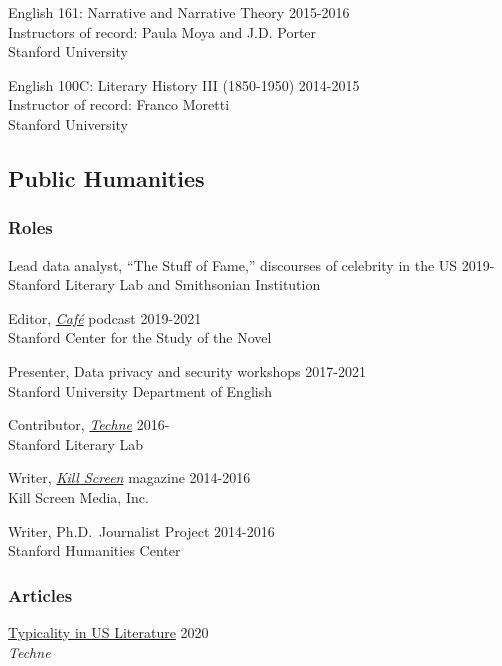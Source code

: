 \documentclass[
  12pt,
  letterpaper,
]{article}
\begin{document}
English 161: Narrative and Narrative Theory \hfill 2015-2016\\
Instructors of record: Paula Moya and J.D. Porter\\
Stanford University

English 100C: Literary History III (1850-1950) \hfill 2014-2015\\
Instructor of record: Franco Moretti\\
Stanford University

\hypertarget{public-humanities}{%
\subsection{Public Humanities}\label{public-humanities}}

\hypertarget{roles}{%
\subsubsection{Roles}\label{roles}}

Lead data analyst, ``The Stuff of Fame,'' discourses of celebrity in the
US \hfill 2019-\\
Stanford Literary Lab and Smithsonian Institution

Editor, \href{https://novel.stanford.edu/csn-cafe}{\emph{Café}} podcast
\hfill 2019-2021\\
Stanford Center for the Study of the Novel

Presenter, Data privacy and security workshops \hfill 2017-2021\\
Stanford University Department of English

Contributor, \href{https://litlab.stanford.edu/techne/}{\emph{Techne}}
\hfill 2016-\\
Stanford Literary Lab

Writer, \href{https://web.archive.org/web/20221003115514/https://killscreen.com/previously/author/erik-fredner/}{\emph{Kill Screen}} magazine \hfill 2014-2016\\
Kill Screen Media, Inc.

Writer, Ph.D.~Journalist Project \hfill 2014-2016\\
Stanford Humanities Center

\hypertarget{articles}{%
\subsubsection{Articles}\label{articles}}

\href{https://web.archive.org/web/20220430165427/https://litlab.stanford.edu/typicality-in-the-u-s-novel/}{Typicality
in US Literature} \hfill 2020\\
\emph{Techne}
\end{document}
